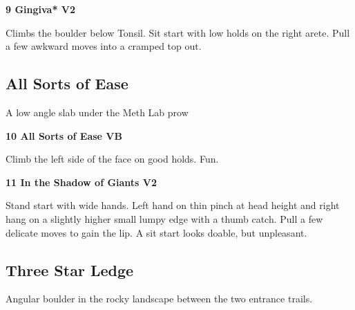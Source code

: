 \begin{multicols}{2}
\begin{adjustwidth}{0.5cm}{}
					
				\end{adjustwidth}
			
			
			\needspace{1.5cm}
\label{rt:Gingiva}
\colorbox{green!20}{
\parbox{0.95\linewidth}{
\textbf{
9 Gingiva* V2  
}}}

			\begin{adjustwidth}{0.5cm}{}			
			Climbs the boulder below Tonsil. Sit start with low holds on the right arete. Pull a few awkward moves into a cramped top out.
			\end{adjustwidth}
			
			
		
		
		\needspace{1.5cm}
		\subsection*{All Sorts of Ease}\label{bf:All Sorts of Ease}
		A low angle slab under the Meth Lab prow\\
	
		
			
			\needspace{1.5cm}
\label{rt:All Sorts of Ease}
\colorbox{green!20}{
\parbox{0.95\linewidth}{
\textbf{
10 All Sorts of Ease VB  
}}}

			\begin{adjustwidth}{0.5cm}{}			
			Climb the left side of the face on good holds. Fun.
			\end{adjustwidth}
			
			
			
			\needspace{1.5cm}
\label{rt:In the Shadow of Giants}
\colorbox{green!20}{
\parbox{0.95\linewidth}{
\textbf{
11 In the Shadow of Giants V2  
}}}

			\begin{adjustwidth}{0.5cm}{}			
			Stand start with wide hands. Left hand on thin pinch at head height and right hang on a slightly higher small lumpy edge with a thumb catch. Pull a few delicate moves to gain the lip. A sit start looks doable, but unpleasant.
			\end{adjustwidth}
			
			
		


		\needspace{1.5cm}
		\subsection*{Three Star Ledge}\label{bf:Three Star Ledge}
		Angular boulder in the rocky landscape between the two entrance trails.\\
	

\end{multicols}
